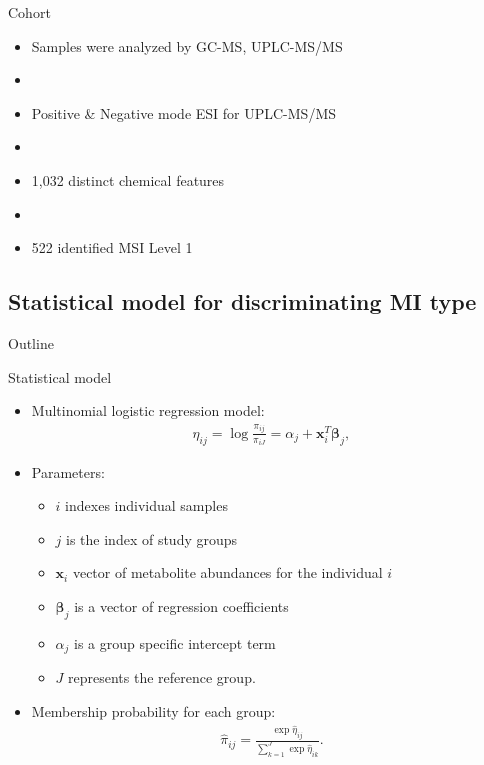 \documentclass[xcolor=dvipsnames]{beamer}
\begin{document}
\begin{frame}{Cohort}
	\vspace{-10pt}
	\begin{itemize}
		\item Samples were analyzed by GC-MS, UPLC-MS/MS \pause
		\item[]
		\item Positive \& Negative mode ESI for UPLC-MS/MS \pause
		\item[]
		\item 1,032 distinct chemical features \pause
		\item[]
		\item 522 identified MSI Level 1
	\end{itemize}
\end{frame}

\subsection{Statistical model for discriminating MI type}
\begin{frame}{Outline}
	\vspace{-10.5pt}
	\tableofcontents[currentsection,subsectionstyle=show/shaded/hide]
\end{frame}

\begin{frame}{Statistical model}
	\vspace{-10.5pt}
	\begin{itemize}
		\item Multinomial logistic regression model:
			\begin{align*}
			\eta_{ij} = \log \frac{\pi_{ij}}{\pi_{iJ}} = \alpha_j + \textbf{x}_i^T \boldsymbol{\beta}_j,
			\end{align*} \pause
		\item Parameters:
		\begin{itemize}
			\item $i$ indexes individual samples
			\item $j$ is the index of study groups
			\item $\textbf{x}_i$ vector of metabolite abundances for the individual $i$
			\item $\boldsymbol{\beta}_j$ is a vector of regression coefficients 
			\item $\alpha_j$ is a group specific intercept term
			\item $J$ represents the reference group.
		\end{itemize} \pause
		\item Membership probability for each group:
		\begin{align*}
		\hat{\pi}_{ij} = \frac{\exp \hat{\eta}_{ij}}{\sum_{k=1}^{J}\exp \hat{\eta}_{ik}}.
		\end{align*}
	\end{itemize}
\end{frame}
\end{document}
